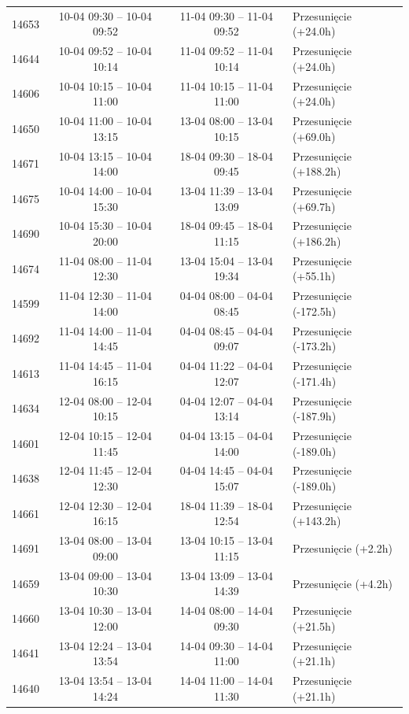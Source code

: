 \begin{table}[htbp]
\begin{tabular}{|r|c|c|l|}
14653 & 10-04 09:30 -- 10-04 09:52 & 11-04 09:30 -- 11-04 09:52 & Przesunięcie (+24.0h) \\ 
14644 & 10-04 09:52 -- 10-04 10:14 & 11-04 09:52 -- 11-04 10:14 & Przesunięcie (+24.0h) \\ 
14606 & 10-04 10:15 -- 10-04 11:00 & 11-04 10:15 -- 11-04 11:00 & Przesunięcie (+24.0h) \\ 
14650 & 10-04 11:00 -- 10-04 13:15 & 13-04 08:00 -- 13-04 10:15 & Przesunięcie (+69.0h) \\ 
14671 & 10-04 13:15 -- 10-04 14:00 & 18-04 09:30 -- 18-04 09:45 & Przesunięcie (+188.2h) \\ 
14675 & 10-04 14:00 -- 10-04 15:30 & 13-04 11:39 -- 13-04 13:09 & Przesunięcie (+69.7h) \\ 
14690 & 10-04 15:30 -- 10-04 20:00 & 18-04 09:45 -- 18-04 11:15 & Przesunięcie (+186.2h) \\ 
14674 & 11-04 08:00 -- 11-04 12:30 & 13-04 15:04 -- 13-04 19:34 & Przesunięcie (+55.1h) \\ 
14599 & 11-04 12:30 -- 11-04 14:00 & 04-04 08:00 -- 04-04 08:45 & Przesunięcie (-172.5h) \\ 
14692 & 11-04 14:00 -- 11-04 14:45 & 04-04 08:45 -- 04-04 09:07 & Przesunięcie (-173.2h) \\ 
14613 & 11-04 14:45 -- 11-04 16:15 & 04-04 11:22 -- 04-04 12:07 & Przesunięcie (-171.4h) \\ 
14634 & 12-04 08:00 -- 12-04 10:15 & 04-04 12:07 -- 04-04 13:14 & Przesunięcie (-187.9h) \\ 
14601 & 12-04 10:15 -- 12-04 11:45 & 04-04 13:15 -- 04-04 14:00 & Przesunięcie (-189.0h) \\ 
14638 & 12-04 11:45 -- 12-04 12:30 & 04-04 14:45 -- 04-04 15:07 & Przesunięcie (-189.0h) \\ 
14661 & 12-04 12:30 -- 12-04 16:15 & 18-04 11:39 -- 18-04 12:54 & Przesunięcie (+143.2h) \\ 
14691 & 13-04 08:00 -- 13-04 09:00 & 13-04 10:15 -- 13-04 11:15 & Przesunięcie (+2.2h) \\ 
14659 & 13-04 09:00 -- 13-04 10:30 & 13-04 13:09 -- 13-04 14:39 & Przesunięcie (+4.2h) \\ 
14660 & 13-04 10:30 -- 13-04 12:00 & 14-04 08:00 -- 14-04 09:30 & Przesunięcie (+21.5h) \\ 
14641 & 13-04 12:24 -- 13-04 13:54 & 14-04 09:30 -- 14-04 11:00 & Przesunięcie (+21.1h) \\ 
14640 & 13-04 13:54 -- 13-04 14:24 & 14-04 11:00 -- 14-04 11:30 & Przesunięcie (+21.1h) \\ 

\end{tabular}
\end{table}

